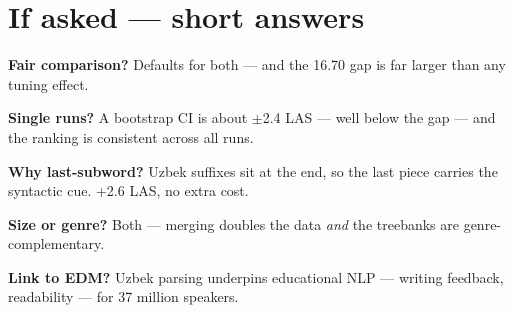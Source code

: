 \documentclass[12pt,a4paper]{article}
\begin{document}
\newpage
\section*{If asked --- short answers}

\noindent\textbf{Fair comparison?} Defaults for both --- and the 16.70 gap
is far larger than any tuning effect.

\vspace{0.3em}
\noindent\textbf{Single runs?} A bootstrap CI is about $\pm$2.4 LAS ---
well below the gap --- and the ranking is consistent across all runs.

\vspace{0.3em}
\noindent\textbf{Why last-subword?} Uzbek suffixes sit at the end, so the
last piece carries the syntactic cue. +2.6 LAS, no extra cost.

\vspace{0.3em}
\noindent\textbf{Size or genre?} Both --- merging doubles the data
\emph{and} the treebanks are genre-complementary.

\vspace{0.3em}
\noindent\textbf{Link to EDM?} Uzbek parsing underpins educational NLP ---
writing feedback, readability --- for 37 million speakers.
\end{document}
